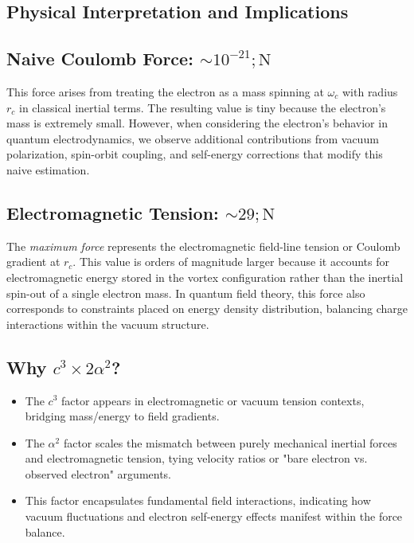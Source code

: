 \subsection*{Physical Interpretation and Implications}


\subsection*{Naive Coulomb Force: $\sim 10^{-21} ; \mathrm{N}$}


This force arises from treating the electron as a mass spinning at $\omega_c$ with radius $r_c$ in classical inertial terms. The resulting value is tiny because the electron’s mass is extremely small. However, when considering the electron’s behavior in quantum electrodynamics, we observe additional contributions from vacuum polarization, spin-orbit coupling, and self-energy corrections that modify this naive estimation.


\subsection*{Electromagnetic Tension: $\sim 29 ; \mathrm{N}$}


The \textit{maximum force} represents the electromagnetic field-line tension or Coulomb gradient at $r_c$. This value is orders of magnitude larger because it accounts for electromagnetic energy stored in the vortex configuration rather than the inertial spin-out of a single electron mass. In quantum field theory, this force also corresponds to constraints placed on energy density distribution, balancing charge interactions within the vacuum structure.


\subsection*{Why $c^3 \times 2 \alpha^2$?}


\begin{itemize}
\item The $c^3$ factor appears in electromagnetic or vacuum tension contexts, bridging mass/energy to field gradients.
\item The $\alpha^2$ factor scales the mismatch between purely mechanical inertial forces and electromagnetic tension, tying velocity ratios or "bare electron vs. observed electron" arguments.
\item This factor encapsulates fundamental field interactions, indicating how vacuum fluctuations and electron self-energy effects manifest within the force balance.
\end{itemize}


